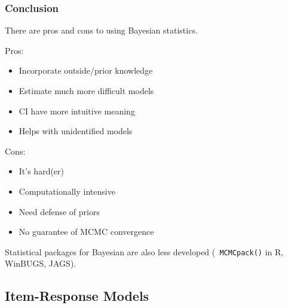 \documentclass[handout]{beamer}
\begin{document}
\begin{frame}
\frametitle{Conclusion}
\pause
There are pros and cons to using Bayesian statistics.
\pause
\bigskip
\begin{multicols}{2}
Pros:
\pause
\begin{itemize}
\item Incorporate outside/prior knowledge
\pause
\item Estimate much more difficult models
\pause
\item CI have more intuitive meaning
\pause
\item Helps with unidentified models
\end{itemize}
\newpage
\pause
Cons:
\pause
\begin{itemize}
\item It's hard(er)
\pause
\item Computationally intensive
\pause
\item Need defense of priors
\pause
\item No guarantee of MCMC convergence
\end{itemize}
\end{multicols}
Statistical packages for Bayesian are also less developed ({\tt
MCMCpack()} in R, WinBUGS, JAGS).
\end{frame}

\subsection{Item-Response Models}
\end{document}
